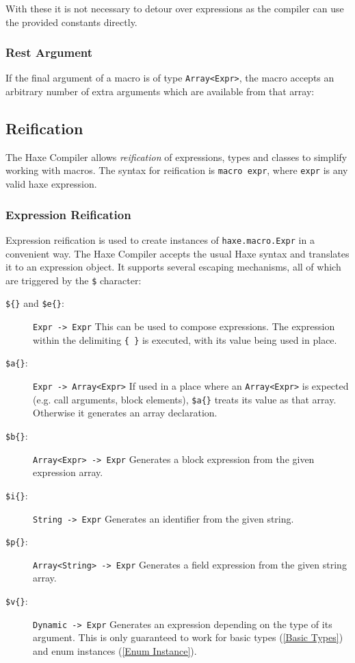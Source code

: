 \documentclass{article}
\newcommand{\type}[1]{\texttt{#1}}
\newcommand{\expr}[1]{\texttt{#1}}
\newcommand{\tref}[2]{#1 (\ref{#2})}
\newcommand{\haxe}[2][]{%
}
\begin{document}
With these it is not necessary to detour over expressions as the compiler can use the provided constants directly.

\subsubsection{Rest Argument}

If the final argument of a macro is of type \type{Array<Expr>}, the macro accepts an arbitrary number of extra arguments which are available from that array:

\haxe{assets/MacroArgumentsRest.hx}




\subsection{Reification}
\label{Reification}

The Haxe Compiler allows \emph{reification} of expressions, types and classes to simplify working with macros. The syntax for reification is \expr{macro expr}, where \expr{expr} is any valid haxe expression.

\subsubsection{Expression Reification}
\label{Expression Reification}

Expression reification is used to create instances of \type{haxe.macro.Expr} in a convenient way. The Haxe Compiler accepts the usual Haxe syntax and translates it to an expression object. It supports several escaping mechanisms, all of which are triggered by the \expr{\$} character:

\begin{description}
	\item[\expr{\$\{\}} and \expr{\$e\{\}}:] \type{Expr -> Expr} This can be used to compose expressions. The expression within the delimiting \expr{\{ \}} is executed, with its value being used in place.
	\item[\expr{\$a\{\}}:] \type{Expr -> Array<Expr>} If used in a place where an \type{Array<Expr>} is expected (e.g. call arguments, block elements), \expr{\$a\{\}} treats its value as that array. Otherwise it generates an array declaration.
	\item[\expr{\$b\{\}}:] \type{Array<Expr> -> Expr} Generates a block expression from the given expression array.
	\item[\expr{\$i\{\}}:] \type{String -> Expr} Generates an identifier from the given string.
	\item[\expr{\$p\{\}}:] \type{Array<String> -> Expr} Generates a field expression from the given string array.
	\item[\expr{\$v\{\}}:] \type{Dynamic -> Expr} Generates an expression depending on the type of its argument. This is only guaranteed to work for \tref{basic types}{Basic Types} and \tref{enum instances}{Enum Instance}.
\end{description}
\end{document}
